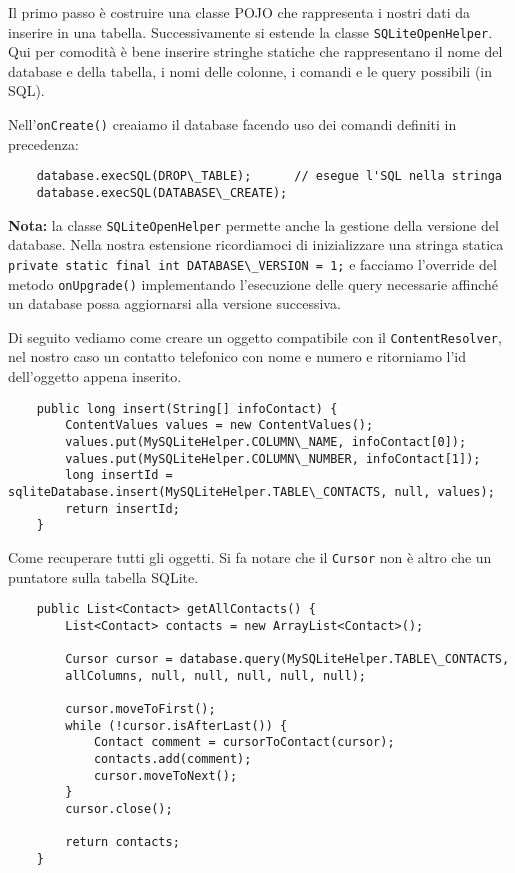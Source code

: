 	Il primo passo è costruire una classe POJO che rappresenta i nostri dati da inserire in una tabella. Successivamente si estende la classe \lstinline|SQLiteOpenHelper|. Qui per comodità è bene inserire stringhe statiche che rappresentano il nome del database e della tabella, i nomi delle colonne, i comandi e le query possibili (in SQL).

	Nell'\lstinline|onCreate()| creaiamo il database facendo uso dei comandi definiti in precedenza:
	\begin{lstlisting}
	database.execSQL(DROP\_TABLE);		// esegue l'SQL nella stringa
	database.execSQL(DATABASE\_CREATE);
	\end{lstlisting}

	\textbf{Nota:} la classe \lstinline|SQLiteOpenHelper| permette anche la gestione della versione del database. Nella nostra estensione ricordiamoci di inizializzare una stringa statica \lstinline|private static final int DATABASE\_VERSION = 1;| e facciamo l'override del metodo \lstinline|onUpgrade()| implementando l'esecuzione delle query necessarie affinché un database possa aggiornarsi alla versione successiva.

	Di seguito vediamo come creare un oggetto compatibile con il \lstinline|ContentResolver|, nel nostro caso un contatto telefonico con nome e numero e ritorniamo l'id dell'oggetto appena inserito.
	\begin{lstlisting}
	public long insert(String[] infoContact) {
		ContentValues values = new ContentValues();
		values.put(MySQLiteHelper.COLUMN\_NAME, infoContact[0]);
		values.put(MySQLiteHelper.COLUMN\_NUMBER, infoContact[1]);
		long insertId = sqliteDatabase.insert(MySQLiteHelper.TABLE\_CONTACTS, null, values);
		return insertId;
	}
	\end{lstlisting}

	Come recuperare tutti gli oggetti. Si fa notare che il \lstinline|Cursor| non è altro che un puntatore sulla tabella SQLite.
	\begin{lstlisting}
	public List<Contact> getAllContacts() {
		List<Contact> contacts = new ArrayList<Contact>();
	
		Cursor cursor = database.query(MySQLiteHelper.TABLE\_CONTACTS,
		allColumns, null, null, null, null, null);
	
		cursor.moveToFirst();
		while (!cursor.isAfterLast()) {
			Contact comment = cursorToContact(cursor);
			contacts.add(comment);
			cursor.moveToNext();
		}
		cursor.close();
	
		return contacts;
	}
	\end{lstlisting}

